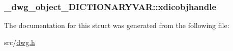 \hypertarget{struct__dwg__object__DICTIONARYVAR_a3e225d2691ff068f9ffa89bfa13007a3}{
\subsubsection[{xdicobjhandle}]{ {\bf \-\_\-dwg\-\_\-object\-\_\-\-D\-I\-C\-T\-I\-O\-N\-A\-R\-Y\-V\-A\-R\-::xdicobjhandle}}}\label{struct__dwg__object__DICTIONARYVAR_a3e225d2691ff068f9ffa89bfa13007a3}


\-The documentation for this struct was generated from the following file\-:\begin{DoxyCompactItemize}
\item 
src/\hyperlink{dwg_8h}{dwg.\-h}\end{DoxyCompactItemize}

